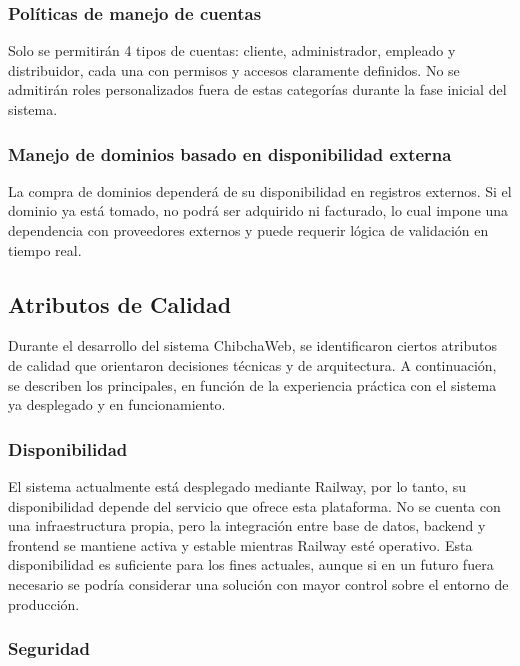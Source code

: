 \subsubsection{Políticas de manejo de cuentas }

Solo se permitirán 4 tipos de cuentas: cliente, administrador, empleado y distribuidor, cada una con permisos y accesos claramente definidos. No se admitirán roles personalizados fuera de estas categorías durante la fase inicial del sistema.

\subsubsection{Manejo de dominios basado en disponibilidad externa }

La compra de dominios dependerá de su disponibilidad en registros externos. Si el dominio ya está tomado, no podrá ser adquirido ni facturado, lo cual impone una dependencia con proveedores externos y puede requerir lógica de validación en tiempo real.

\subsection{Atributos de Calidad}

Durante el desarrollo del sistema ChibchaWeb, se identificaron ciertos atributos de calidad que orientaron decisiones técnicas y de arquitectura. A continuación, se describen los principales, en función de la experiencia práctica con el sistema ya desplegado y en funcionamiento.

\subsubsection{Disponibilidad}

El sistema actualmente está desplegado mediante Railway, por lo tanto, su disponibilidad depende del servicio que ofrece esta plataforma. No se cuenta con una infraestructura propia, pero la integración entre base de datos, backend y frontend se mantiene activa y estable mientras Railway esté operativo. Esta disponibilidad es suficiente para los fines actuales, aunque si en un futuro fuera necesario se podría considerar una solución con mayor control sobre el entorno de producción.

\subsubsection{Seguridad}

